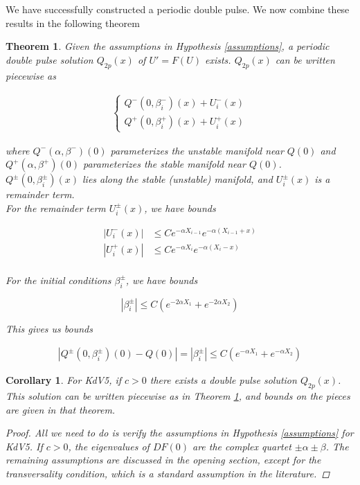 \documentclass[12pt]{article}
\newtheorem{theorem}{Theorem}
\newtheorem{corollary}{Corollary}
\begin{document}
We have successfully constructed a periodic double pulse. We now combine these results in the following theorem


\begin{theorem}\label{2pconstruction}
Given the assumptions in Hypothesis \ref{assumptions}, a periodic double pulse solution $Q_{2p}(x)$ of $U' = F(U)$ exists. $Q_{2p}(x)$ can be written piecewise as

\begin{align*}
\begin{cases}
Q^-(0, \beta_i^-)(x) + U_i^-(x) \\
Q^+(0, \beta_i^+)(x) + U_i^+(x)
\end{cases}
\end{align*}

where $Q^-(\alpha, \beta^-)(0)$ parameterizes the unstable manifold near $Q(0)$ and $Q^+(\alpha, \beta^+)(0)$ parameterizes the stable manifold near $Q(0)$. $Q^\pm(0, \beta_i^\pm)(x)$ lies along the stable (unstable) manifold, and $U_i^\pm(x)$ is a remainder term.\\

For the remainder term $U_i^\pm(x)$, we have bounds

\begin{align*}
|U_i^-(x)| &\leq C e^{-\alpha X_{i-1}} e^{-\alpha(X_{i-1} + x)} \\
|U_i^+(x)| &\leq C e^{-\alpha X_i} e^{-\alpha(X_i - x)} \\
\end{align*}

For the initial conditions $\beta_i^\pm$, we have bounds

\begin{equation}
| \beta_i^\pm | \leq C (e^{-2 \alpha X_1} + e^{-2 \alpha X_2})
\end{equation}

This gives us bounds

\begin{align*}
|Q^\pm(0, \beta_i^\pm)(0) - Q(0)| = |\beta_i^\pm| \leq 
C \left( e^{-\alpha X_1} + e^{-\alpha X_2} \right)
\end{align*}

\end{theorem}


\begin{corollary}
For KdV5, if $c > 0$ there exists a double pulse solution $Q_{2p}(x)$. This solution can be written piecewise as in Theorem \ref{2pconstruction}, and bounds on the pieces are given in that theorem.

\begin{proof}
All we need to do is verify the assumptions in Hypothesis \ref{assumptions} for KdV5. If $c > 0$, the eigenvalues of $DF(0)$ are the complex quartet $\pm \alpha \pm \beta$. The remaining assumptions are discussed in the opening section, except for the transversality condition, which is a standard assumption in the literature.
\end{proof}

\end{corollary}
\end{document}
